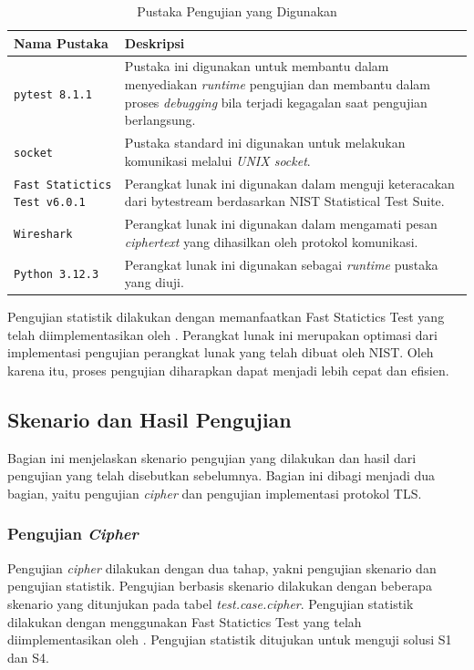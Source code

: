 \begin{table}[!h]
  \centering
  \caption{Pustaka Pengujian yang Digunakan} \label{tab:test.lib}
  \begin{tabular}{|p{4cm}|p{9cm}|}
    \hline
    Nama Pustaka & Deskripsi \\ \hline
    \texttt{pytest 8.1.1} & Pustaka ini digunakan untuk membantu dalam menyediakan \emph{runtime} pengujian dan membantu dalam proses \emph{debugging} bila terjadi kegagalan saat pengujian berlangsung. \\ \hline
    \texttt{socket} & Pustaka standard ini digunakan untuk melakukan komunikasi melalui \emph{UNIX socket}.\\ \hline
    \texttt{Fast Statictics Test v6.0.1} & Perangkat lunak ini digunakan dalam menguji keteracakan dari bytestream berdasarkan NIST Statistical Test Suite.\\ \hline
    \texttt{Wireshark} & Perangkat lunak ini digunakan dalam mengamati pesan \emph{ciphertext} yang dihasilkan oleh protokol komunikasi.\\ \hline
    \texttt{Python 3.12.3} & Perangkat lunak ini digunakan sebagai \emph{runtime} pustaka yang diuji.\\ \hline
    \end{tabular}
  \end{table}
    

  Pengujian statistik dilakukan dengan memanfaatkan Fast Statictics Test yang telah diimplementasikan oleh \textcite{marek2016}. Perangkat lunak ini merupakan optimasi dari implementasi pengujian perangkat lunak yang telah dibuat oleh NIST. Oleh karena itu, proses pengujian diharapkan dapat menjadi lebih cepat dan efisien. 

\subsection{Skenario dan Hasil Pengujian}

Bagian ini menjelaskan skenario pengujian yang dilakukan dan hasil dari pengujian yang telah disebutkan sebelumnya. Bagian ini dibagi menjadi dua bagian, yaitu pengujian \emph{cipher} dan pengujian implementasi protokol TLS.

\subsubsection{Pengujian \emph{Cipher}}

Pengujian \emph{cipher} dilakukan dengan dua tahap, yakni pengujian skenario dan pengujian statistik. Pengujian berbasis skenario dilakukan dengan beberapa skenario yang ditunjukan pada tabel \emph{test.case.cipher}. Pengujian statistik dilakukan dengan menggunakan Fast Statictics Test yang telah diimplementasikan oleh \textcite{marek2016}. Pengujian statistik ditujukan untuk menguji solusi S1 dan S4.

